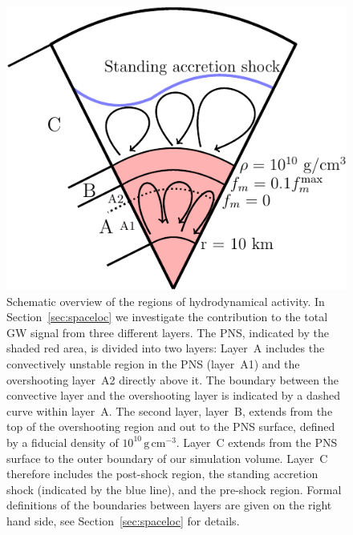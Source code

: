 \begin{figure}
\centering
\includegraphics[width=0.7\linewidth]{./images/paper1/fig4.pdf}
\caption{Schematic overview of the regions of hydrodynamical activity. In
  Section~\ref{sec:spaceloc} we investigate the contribution to
  the total GW signal from three different layers. The PNS, indicated by
  the shaded red area, is divided into two layers: Layer~A includes
  the convectively unstable region in the PNS (layer~A1) and the overshooting
  layer~A2 directly above it. The boundary between the convective
  layer and the overshooting layer is indicated by a dashed curve
  within layer~A.
  The second layer, layer~B, extends from the
  top of the overshooting region and out to the PNS surface, defined
  by a fiducial density of $10^{10} \, \mathrm{g} \, \mathrm{cm}^{-3}$. Layer~C
  extends from the PNS surface to the outer boundary of our simulation
  volume. Layer~C therefore includes the post-shock region, the
  standing accretion shock (indicated by the blue line), and the
  pre-shock region. Formal definitions of the boundaries between
  layers are given on the right hand side, see
  Section~\ref{sec:spaceloc} for details.
\label{fig:PNSski}}
\end{figure}
